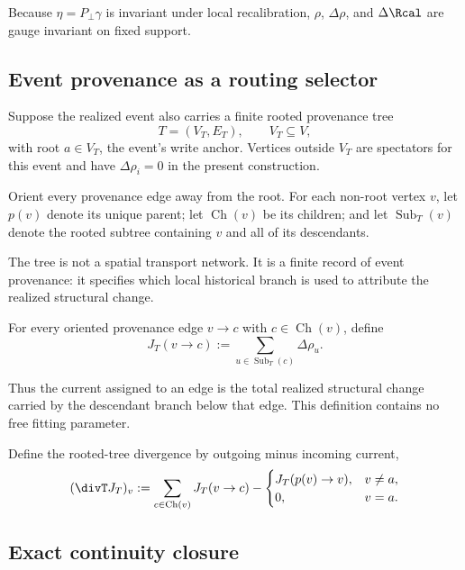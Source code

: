Because $\eta=P_\perp\gamma$ is invariant under local recalibration, $\rho$, $\Delta\rho$, and $\Delta\Rcal$ are gauge invariant on fixed support.

\subsection{Event provenance as a routing selector}

Suppose the realized event also carries a finite rooted provenance tree
\begin{equation}
T=(V_T,E_T),
\qquad V_T\subseteq V,
\end{equation}
with root $a\in V_T$, the event's write anchor. Vertices outside $V_T$ are spectators for this event and have $\Delta\rho_i=0$ in the present construction.

Orient every provenance edge away from the root. For each non-root vertex $v$, let $p(v)$ denote its unique parent; let $\operatorname{Ch}(v)$ be its children; and let $\operatorname{Sub}_T(v)$ denote the rooted subtree containing $v$ and all of its descendants.

The tree is not a spatial transport network. It is a finite record of event provenance: it specifies which local historical branch is used to attribute the realized structural change.

\begin{definition}
For every oriented provenance edge $v\to c$ with $c\in\operatorname{Ch}(v)$, define
\begin{equation}
J_T(v\to c)
:=
\sum_{u\in\operatorname{Sub}_T(c)}\Delta\rho_u.
\label{eq:provenance-current}
\end{equation}
\end{definition}

Thus the current assigned to an edge is the total realized structural change carried by the descendant branch below that edge. This definition contains no free fitting parameter.

Define the rooted-tree divergence by outgoing minus incoming current,
\begin{equation}
(\divT J_T)_v
:=
\sum_{c\in\operatorname{Ch}(v)}J_T(v\to c)
-
\begin{cases}
J_T(p(v)\to v), & v\neq a,\\
0, & v=a.
\end{cases}
\label{eq:tree-divergence}
\end{equation}

\subsection{Exact continuity closure}

